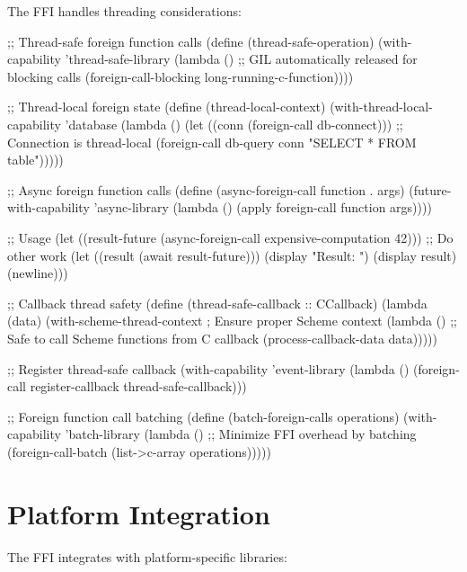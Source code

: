 
The FFI handles threading considerations:

\begin{example}
\begin{lambdustcode}
;; Thread-safe foreign function calls
(define (thread-safe-operation)
  (with-capability 'thread-safe-library
    (lambda ()
      ;; GIL automatically released for blocking calls
      (foreign-call-blocking long-running-c-function))))

;; Thread-local foreign state
(define (thread-local-context)
  (with-thread-local-capability 'database
    (lambda ()
      (let ((conn (foreign-call db-connect)))
        ;; Connection is thread-local
        (foreign-call db-query conn "SELECT * FROM table")))))

;; Async foreign function calls  
(define (async-foreign-call function . args)
  (future-with-capability 'async-library
    (lambda ()
      (apply foreign-call function args))))

;; Usage
(let ((result-future (async-foreign-call expensive-computation 42)))
  ;; Do other work
  (let ((result (await result-future)))
    (display "Result: ") (display result) (newline)))

;; Callback thread safety
(define (thread-safe-callback :: CCallback)
  (lambda (data)
    (with-scheme-thread-context  ; Ensure proper Scheme context
      (lambda ()
        ;; Safe to call Scheme functions from C callback
        (process-callback-data data)))))

;; Register thread-safe callback
(with-capability 'event-library
  (lambda ()
    (foreign-call register-callback thread-safe-callback)))

;; Foreign function call batching
(define (batch-foreign-calls operations)
  (with-capability 'batch-library  
    (lambda ()
      ;; Minimize FFI overhead by batching
      (foreign-call-batch (list->c-array operations)))))
\end{lambdustcode}
\end{example}

\section{Platform Integration}
\label{sec:platform-integration}


The FFI integrates with platform-specific libraries:

